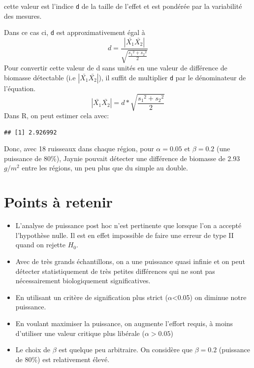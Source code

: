 \documentclass[12pt,]{book}
\makeatletter
\newenvironment{Shaded}{\begin{snugshade}}{\end{snugshade}}
\newcommand{\DataTypeTok}[1]{\textcolor[rgb]{0.27,0.27,0.27}{#1}}
\newcommand{\DecValTok}[1]{\textcolor[rgb]{0.06,0.06,0.06}{#1}}
\newcommand{\FloatTok}[1]{\textcolor[rgb]{0.06,0.06,0.06}{#1}}
\newcommand{\KeywordTok}[1]{\textcolor[rgb]{0.27,0.27,0.27}{\textbf{#1}}}
\newcommand{\NormalTok}[1]{#1}
\newcommand{\OperatorTok}[1]{\textcolor[rgb]{0.43,0.43,0.43}{\textbf{#1}}}
\newcommand{\StringTok}[1]{\textcolor[rgb]{0.5,0.5,0.5}{#1}}
\providecommand{\tightlist}{%
  \setlength{\itemsep}{0pt}\setlength{\parskip}{0pt}}
\newenvironment{kframe}{%
\medskip{}
\setlength{\fboxsep}{.8em}
 \def\at@end@of@kframe{}%
 \ifinner\ifhmode%
  \def\at@end@of@kframe{\end{minipage}}%
  \begin{minipage}{\columnwidth}%
 \fi\fi%
 \def\FrameCommand##1{\hskip\@totalleftmargin \hskip-\fboxsep
 \colorbox{shadecolor}{##1}\hskip-\fboxsep
     \hskip-\linewidth \hskip-\@totalleftmargin \hskip\columnwidth}%
 \MakeFramed {\advance\hsize-\width
   \@totalleftmargin\z@ \linewidth\hsize
   \@setminipage}}%
 {\par\unskip\endMakeFramed%
 \at@end@of@kframe}
\newenvironment{rmdblock}[1]
  {
  \begin{itemize}
  \renewcommand{\labelitemi}{
    \raisebox{-.7\height}[0pt][0pt]{
      {\setkeys{Gin}{width=3em,keepaspectratio}\texttt{[image: images/\#1]}}
    }
  }
  \setlength{\fboxsep}{1em}
  \begin{kframe}
  \item
  }
  {
  \end{kframe}
  \end{itemize}
  }
\newenvironment{rmdcaution}
  {\begin{rmdblock}{caution}}
  {\end{rmdblock}}
\makeatother
\begin{document}
\begin{rmdcaution}
cette valeur est l'indice \texttt{d} de la taille de l'effet et est pondérée par la variabilité des mesures.
\end{rmdcaution}

Dans ce cas ci, \texttt{d} est approximativement égal à
\[ d = \frac{| \bar{X_1} \bar{X_2} |} {\sqrt{\frac{{s_1}^2 +{s_2}^2}{2}}}\]
Pour convertir cette valeur de d sans unités en une valeur de différence de biomasse détectable (i.e \(| \bar{X_1} \bar{X_2} |\)), il suffit de multiplier \texttt{d} par le dénominateur de l'équation.
\[
| \bar{X_1} \bar{X_2} | = d * \sqrt{\frac{{s_1}^2 +{s_2}^2}{2}}
\]
Dans R, on peut estimer cela avec:

\begin{Shaded}
\end{Shaded}

\begin{verbatim}
## [1] 2.926992
\end{verbatim}

Donc, avec 18 ruisseaux dans chaque région, pour \(\alpha=0.05\) et \(\beta=0.2\) (une puissance de 80\%), Jaynie pouvait détecter une différence de biomasse de 2.93\(g/m^2\) entre les régions, un peu plus que du simple au double.

\hypertarget{points-uxe0-retenir}{%
\section{Points à retenir}\label{points-uxe0-retenir}}

\begin{itemize}
\tightlist
\item
  L'analyse de puissance post hoc n'est pertinente que lorsque l'on a accepté l'hypothèse nulle.
  Il est en effet impossible de faire une erreur de type II quand on rejette \(H_0\).
\item
  Avec de très grands échantillons, on a une puissance quasi infinie et on peut détecter statistiquement de très petites différences qui ne sont pas nécessairement biologiquement significatives.
\item
  En utilisant un critère de signification plus strict (\(\alpha\)\textless{}0.05) on diminue notre puissance.
\item
  En voulant maximiser la puissance, on augmente l'effort requis, à moins d'utiliser une valeur critique plus libérale (\(\alpha>0.05\))
\item
  Le choix de \(\beta\) est quelque peu arbitraire.
  On considère que \(\beta=0.2\) (puissance de 80\%) est relativement élevé.
\end{itemize}
\end{document}
